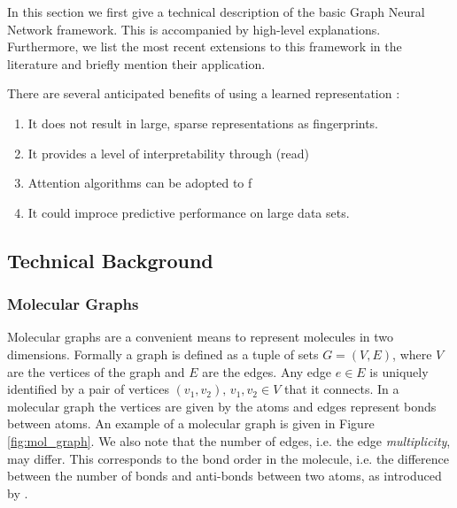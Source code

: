 In this section we first give a technical description of the basic Graph Neural Network framework. This is accompanied by high-level explanations. Furthermore, we list the most recent extensions to this framework in the literature and briefly mention their application. 


There are several anticipated benefits of using a learned representation \citep{SHEN201929}:
\begin{enumerate}
	\item It does not result in large, sparse representations as fingerprints.
	\item It provides a level of interpretability through \citep{duvenaud2015convolutional} (read)
	\item Attention algorithms can be adopted to f \citep{deepchemstable, graphattentionmpp}
	\item It could improce predictive performance on large data sets. \citep{yangMPP}
\end{enumerate}
\subsection{Technical Background}
\subsubsection{Molecular Graphs}
\label{sec:mol_graphs}
Molecular graphs are a convenient means to represent molecules in two dimensions. Formally a graph is defined as a tuple of sets $G = (V,E)$, where $V$ are the vertices of the graph and $E$ are the edges. Any edge $e \in E$ is uniquely identified by a pair of vertices $(v_1, v_2), \, v_1, v_2 \in V$ that it connects. In a molecular graph the vertices are given by the atoms and edges represent bonds between atoms. An example of a molecular graph is given in Figure \ref{fig:mol_graph}. We also note that the number of edges, i.e. the edge \emph{multiplicity}, may differ. This corresponds to the bond order in the molecule, i.e. the difference between the number of bonds and anti-bonds between two atoms, as introduced by \cite{pauling}. 

